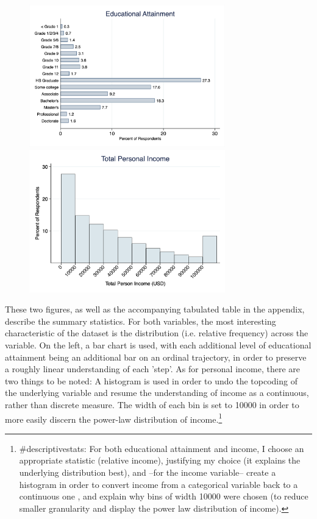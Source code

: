 \documentclass{article}
\begin{document}
\begin{figure}[h]
	\centering
	\includegraphics[width=8.5cm]{hist2.png}
	\includegraphics[width=8.5cm]{hist1.png}

\end{figure}

These two figures, as well as the accompanying tabulated table in the appendix, describe the summary statistics. For both variables, the most interesting characteristic of the dataset is the distribution (i.e. relative frequency) across the variable. On the left, a bar chart is used, with each additional level of educational attainment being an additional bar on an ordinal trajectory, in order to preserve a roughly linear understanding of each 'step'. As for personal income, there are two things to be noted: A histogram is used in order to undo the topcoding of the underlying variable and resume the understanding of income as a continuous, rather than discrete measure. The width of each bin is set to 10000 in order to more easily discern the power-law distribution of income.\footnote{\#descriptivestats: For both educational attainment and income, I choose an appropriate statistic (relative income), justifying my choice (it explains the underlying distribution best), and --for the income variable-- create a histogram in order to convert income from a categorical variable back to a continuous one , and explain why bins of width 10000 were chosen (to reduce smaller granularity and display the power law distribution of income).} \\
\end{document}
